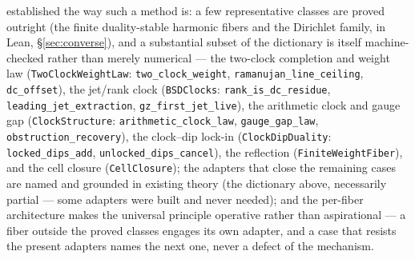 \documentclass[11pt]{article}
\theoremstyle{definition}
\begin{document}
established the way such a method is: a few representative classes are proved outright (the finite
duality-stable harmonic fibers and the Dirichlet family, in Lean, \S\ref{sec:converse}), and a substantial
subset of the dictionary is itself machine-checked rather than merely numerical --- the two-clock
completion and weight law (\texttt{TwoClockWeightLaw}: \texttt{two\_clock\_weight},
\texttt{ramanujan\_line\_ceiling}, \texttt{dc\_offset}), the jet/rank clock (\texttt{BSDClocks}:
\texttt{rank\_is\_dc\_residue}, \texttt{leading\_jet\_extraction}, \texttt{gz\_first\_jet\_live}), the
arithmetic clock and gauge gap (\texttt{ClockStructure}: \texttt{arithmetic\_clock\_law},
\texttt{gauge\_gap\_law}, \texttt{obstruction\_recovery}), the clock--dip lock-in (\texttt{ClockDipDuality}:
\texttt{locked\_dips\_add}, \texttt{unlocked\_dips\_cancel}), the reflection (\texttt{FiniteWeightFiber}),
and the cell closure (\texttt{CellClosure}); the adapters that close the remaining cases are named and
grounded in existing theory (the dictionary above, necessarily partial --- some adapters were built and
never needed); and the per-fiber architecture makes the universal principle
operative rather than aspirational --- a fiber outside the proved classes engages its own adapter, and a case
that resists the present adapters names the next one, never a defect of the mechanism.
\end{document}
